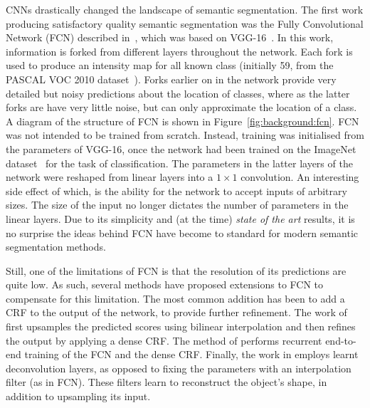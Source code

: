 CNNs drastically changed the landscape of semantic segmentation. The
first work producing satisfactory quality semantic segmentation was
the Fully Convolutional Network (FCN) described
in~\cite{long2015fully}, which was based on
VGG-16~\cite{simonyan2014vgg}. In this work, information is forked
from different layers throughout the network. Each fork is used to
produce an intensity map for all known class (initially 59, from the
PASCAL VOC 2010 dataset~\cite{everingham2010pascal}). Forks earlier on
in the network provide very detailed but noisy predictions about the
location of classes, where as the latter forks are have very little
noise, but can only approximate the location of a class. A diagram of
the structure of FCN is shown in Figure~\ref{fig:background:fcn}. FCN
was not intended to be trained from scratch. Instead, training was
initialised from the parameters of VGG-16, once the network had been
trained on the ImageNet dataset~\cite{krizhevsky2012imagenet} for the
task of classification. The parameters in the latter layers of the
network were reshaped from linear layers into a $1\times 1$
convolution. An interesting side effect of which, is the ability for
the network to accept inputs of arbitrary sizes. The size of the input
no longer dictates the number of parameters in the linear layers. Due
to its simplicity and (at the time) \textit{state of the art} results,
it is no surprise the ideas behind FCN have become to standard for
modern semantic segmentation methods.

Still, one of the limitations of FCN is that the resolution of its
predictions are quite low. As such, several methods have proposed
extensions to FCN to compensate for this limitation. The most common
addition has been to add a CRF to the output of the network, to
provide further refinement. The work of \cite{chen2015semantic}
first upsamples the predicted scores using bilinear interpolation
and then refines the output by applying a dense CRF. The method of
\cite{zheng2015conditional} performs recurrent end-to-end training of
the FCN and the dense CRF. Finally, the work in \cite{noh2015learning}
employs learnt deconvolution layers, as opposed to fixing the
parameters with an interpolation filter (as in FCN). These filters
learn to reconstruct the object's shape, in addition to upsampling its
input.

